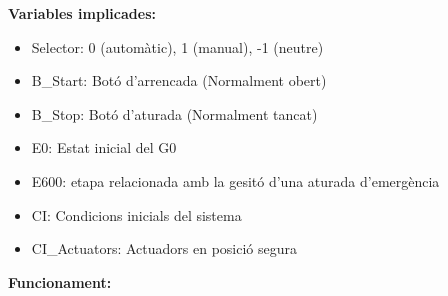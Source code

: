 \documentclass[a4paper,11pt,DIV=13,headings=normal,abstract=true,twoside=semi]{article}
\begin{document}
\textbf{Variables implicades:}
\begin{itemize}
\item Selector: 0 (automàtic), 1 (manual), -1 (neutre)
\item B\_Start: Botó d'arrencada (Normalment obert)
\item B\_Stop: Botó d'aturada (Normalment tancat)
\item E0: Estat inicial del G0
\item E600: etapa relacionada amb la gesitó d'una aturada d'emergència
\item CI: Condicions inicials del sistema
\item CI\_Actuators: Actuadors en posició segura
\end{itemize}

\textbf{Funcionament:}
\end{document}
